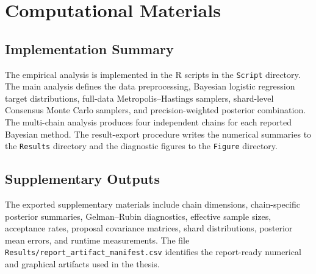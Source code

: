 \chapter{Computational Materials}

\section{Implementation Summary}

The empirical analysis is implemented in the R scripts in the \texttt{Script} directory. The main analysis defines the data preprocessing, Bayesian logistic regression target distributions, full-data Metropolis--Hastings samplers, shard-level Consensus Monte Carlo samplers, and precision-weighted posterior combination. The multi-chain analysis produces four independent chains for each reported Bayesian method. The result-export procedure writes the numerical summaries to the \texttt{Results} directory and the diagnostic figures to the \texttt{Figure} directory.

\section{Supplementary Outputs}

The exported supplementary materials include chain dimensions, chain-specific posterior summaries, Gelman--Rubin diagnostics, effective sample sizes, acceptance rates, proposal covariance matrices, shard distributions, posterior mean errors, and runtime measurements. The file \texttt{Results/report\_artifact\_manifest.csv} identifies the report-ready numerical and graphical artifacts used in the thesis.
